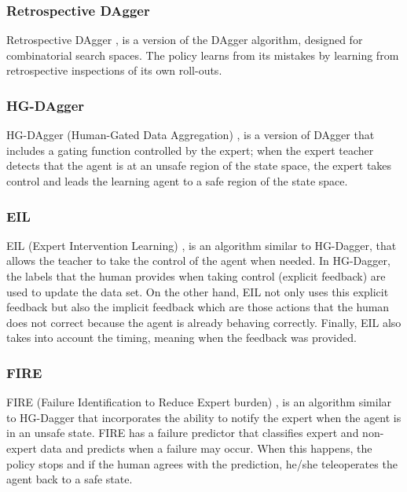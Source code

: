 \subsubsection*{Retrospective DAgger}
Retrospective DAgger \cite{Retrospective-DAgger-song:2019}, is a version of the DAgger \cite{DAgger-Ross:2011} algorithm, designed for combinatorial search spaces. The policy learns from its mistakes by learning from retrospective inspections of its own roll-outs.  

\subsubsection*{HG-DAgger}
HG-DAgger (Human-Gated Data Aggregation) \cite{HG-DAgger-Kelly:2019}, is a version of DAgger \cite{DAgger-Ross:2011} that includes a gating function controlled by the expert; when the expert teacher detects that the agent is at an unsafe region of the state space, the expert takes control and leads the learning agent to a safe region of the state space.

\subsubsection*{EIL}
EIL (Expert Intervention Learning) \cite{EIL-Spencer:2020}, is an algorithm similar to HG-Dagger, that allows the teacher to take the control of the agent when needed. In HG-Dagger,  the labels that the human provides when taking control (explicit feedback) are used to update the data set. On the other hand, EIL not only uses this explicit feedback but also the implicit feedback which are those actions that the human does not correct because the agent is already behaving correctly. Finally, EIL also takes into account the timing, meaning when the feedback was provided.

\subsubsection*{FIRE}
FIRE (Failure Identification to Reduce Expert burden) \cite{FIRE-ablett:2020}, is an algorithm similar to HG-Dagger that incorporates the ability to notify the expert when the agent is in an unsafe state. FIRE has a  failure predictor that classifies expert and non-expert data and predicts when a failure may occur. When this happens, the policy stops and if the human agrees with the prediction, he/she teleoperates the agent back to a safe state.

